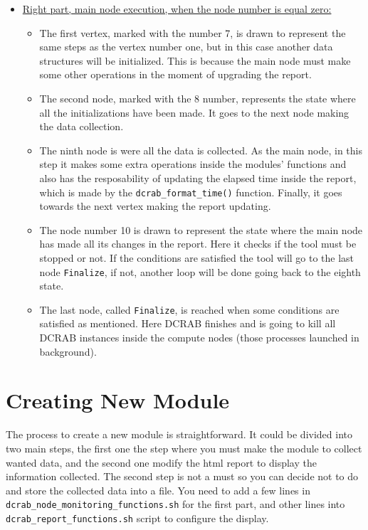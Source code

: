\documentclass[10pt,a4paper]{report}
\begin{document}
\begin{itemize}
  \item \underline{Right part, main node execution, when the node number is equal zero:}
  \begin{itemize}
    \item The first vertex, marked with the number 7, is drawn to represent the same steps as the vertex number one, but in this case another data structures will be initialized. This is because the main node must make some other operations in the moment of upgrading the report.
    \item The second node, marked with the 8 number, represents the state where all the initializations have been made. It goes to the next node making the data collection.
    \item The ninth node is were all the data is collected. As the main node, in this step it makes some extra operations inside the modules' functions and also has the resposability of updating the elapsed time inside the report, which is made by the \texttt{dcrab\_format\_time()} function. Finally, it goes towards the next vertex making the report updating.
    \item The node number 10 is drawn to represent the state where the main node has made all its changes in the report. Here it checks if the tool must be stopped or not. If the conditions are satisfied the tool will go to the last node \verb+Finalize+, if not, another loop will be done going back to the eighth state.
    \item The last node, called \verb+Finalize+, is reached when some conditions are satisfied as mentioned. Here DCRAB finishes and is going to kill all DCRAB instances inside the compute nodes (those processes launched in background).
  \end{itemize}
\end{itemize}

\chapter{Creating New Module}

The process to create a new module is straightforward. It could be divided into two main steps, the first one the step where you must make the module to collect wanted data, and the second one modify the html report to display the information collected. The second step is not a must so you can decide not to do and store the collected data into a file. You need to add a few lines in \texttt{dcrab\_node\_monitoring\_functions.sh} for the first part, and other lines into \texttt{dcrab\_report\_functions.sh} script to configure the display.
\end{document}
